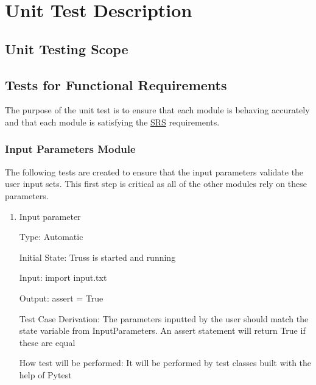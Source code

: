 \documentclass[12pt, titlepage]{article}
\begin{document}
\section{Unit Test Description} \label{unitdescript}

\subsection{Unit Testing Scope}


\subsection{Tests for Functional Requirements}
The purpose of the unit test is to ensure that each module is behaving 
accurately and that each module is satisfying the 
\href{https://github.com/tingyuw/cas741/blob/master/docs/SRS/SRS.pdf}{SRS} 
requirements.

\subsubsection{Input Parameters Module} \label{inParam}
The following tests are created to ensure that the input parameters validate 
the user input sets. This first step is critical as all of the other
modules rely on these parameters.

\begin{enumerate}
\item{Input parameter\\}
	
	Type: Automatic
	
	Initial State: Truss is started and running
	
	Input: import input.txt 
	
	Output: assert = True
	
	Test Case Derivation: The parameters inputted by the user should match the
	state variable from InputParameters. An assert statement will return True 
	if these are equal
	
	How test will be performed: It will be performed by test classes built with 
	the help of Pytest
\end{enumerate}
\end{document}
